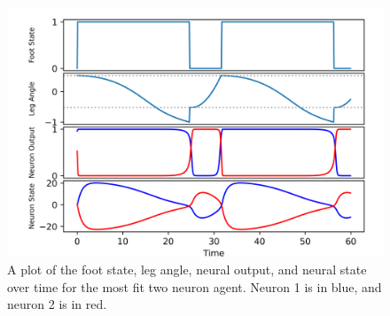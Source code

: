 \documentclass{article}
\begin{document}
\begin{figure}[htbp]
  \centering
  \includegraphics[width=.8\textwidth]{../plots/angleTime2_224_18_Foot.png}
  \caption{A plot of the foot state, leg angle, neural output, and neural state over time for the most fit two neuron agent. Neuron 1 is in blue, and neuron 2 is in red.}
  \label{fig:fullplot2Best}
\end{figure}
\end{document}
